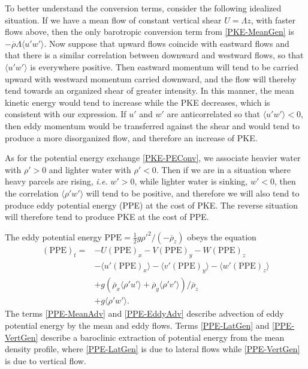 \documentclass[letterpaper, 11pt, onecolumn]{article}
\begin{document}
To better understand the conversion terms, consider the following idealized
situation. If we have a mean flow of constant vertical shear $U = \Lambda z$,
with faster flows above, then the only barotropic conversion term from
\eqref{PKE-MeanGen} is $-\overline{\rho} \Lambda \langle u' w' \rangle$. Now
suppose that upward flows coincide with eastward flows and that there is a
similar correlation between downward and westward flows, so that $\langle u' w'
\rangle$ is everywhere positive. Then eastward momentum will tend to be carried
upward with westward momentum carried downward, and the flow will thereby tend
towards an organized shear of greater intensity. In this manner, the mean
kinetic energy would tend to increase while the PKE decreases, which is
consistent with our expression. If $u'$ and $w'$ are anticorrelated so that
$\langle u' w' \rangle < 0$, then eddy momentum would be transferred against
the shear and would tend to produce a more disorganized flow, and therefore an
increase of PKE.

As for the potential energy exchange \eqref{PKE-PEConv}, we associate heavier
water with $\rho' > 0$ and lighter water with $\rho' < 0$. Then if we are in a
situation where heavy parcels are rising, \emph{i.e.} $w' > 0$, while lighter
water is sinking, $w' < 0$, then the correlation $\langle \rho' w' \rangle$
will tend to be positive, and therefore we will also tend to produce eddy
potential energy (PPE) at the cost of PKE. The reverse situation will therefore
tend to produce PKE at the cost of PPE.

The eddy potential energy $\text{PPE} = \frac{1}{2} g \rho'^2 /
\left(-\overline{\rho}_z\right)$ obeys the equation
\begin{subequations}\label{PPE-eqn} \begin{align}
  \left(\text{PPE}\right)_t =& -U \left(\text{PPE}\right)_x - V
\left(\text{PPE}\right)_y -W \left(\text{PPE}\right)_z \label{PPE-MeanAdv}\\
  & - \langle u' \left(\text{PPE}\right)_x \rangle - \langle v'
\left(\text{PPE}\right)_y \rangle - \langle w' \left(\text{PPE}\right)_z
\rangle \label{PPE-EddyAdv} \\
  & + g \left(\overline{\rho}_x \langle \rho' u' \rangle + \overline{\rho}_y
\langle \rho' v' \rangle \right) / \overline{\rho}_z \label{PPE-LatGen} \\
  & + g \langle \rho' w' \rangle \label{PPE-VertGen}. \end{align}
\end{subequations} The terms \eqref{PPE-MeanAdv} and \eqref{PPE-EddyAdv}
describe advection of eddy potential energy by the mean and eddy flows. Terms
\eqref{PPE-LatGen} and \eqref{PPE-VertGen} describe a baroclinic extraction of
potential energy from the mean density profile, where \eqref{PPE-LatGen} is due
to lateral flows while \eqref{PPE-VertGen} is due to vertical flow.
\end{document}
